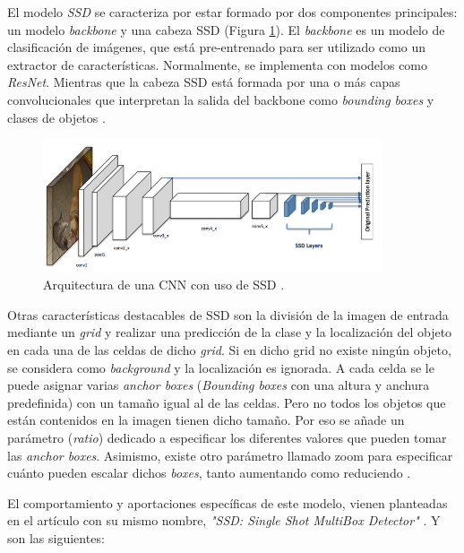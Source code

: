El modelo \textit{SSD} se caracteriza por estar formado por dos componentes principales: un modelo \textit{backbone} y una cabeza SSD (Figura \ref{fig:ssd}). El \textit{backbone} es un modelo de clasificación de imágenes, que está pre-entrenado para ser utilizado como un extractor de características. Normalmente, se implementa con modelos como \textit{ResNet}. Mientras que la cabeza SSD está formada por una o más capas convolucionales que interpretan la salida del backbone como \textit{bounding boxes} y clases de objetos \cite{ssdwork}. 

\begin{figure}[htp]
	\centering
	\includegraphics[width=10cm]{imagenes/cnnssd.png}
	\caption[Arquitectura de una CNN con uso de SSD.]{Arquitectura de una CNN con uso de SSD \cite{ssdwork}.}
	\label{fig:ssd}
\end{figure}

Otras características destacables de SSD son la división de la imagen de entrada mediante un \textit{grid} y realizar una predicción de la clase y la localización del objeto en cada una de las celdas de dicho \textit{grid}. Si en dicho grid no existe ningún objeto, se considera como \textit{background} y la localización es ignorada. A cada celda se le puede asignar varias \textit{anchor boxes} (\textit{Bounding boxes} con una altura y anchura predefinida) con un tamaño igual al de las celdas. Pero no todos los objetos que están contenidos en la imagen tienen dicho tamaño. Por eso se añade un parámetro (\textit{ratio}) dedicado a especificar los diferentes valores que pueden tomar las \textit{anchor boxes}. Asimismo, existe otro parámetro llamado zoom para especificar cuánto pueden escalar dichos \textit{boxes}, tanto aumentando como reduciendo \cite{ssdwork}.

El comportamiento y aportaciones específicas de este modelo, vienen planteadas en el artículo con su mismo nombre, \textit{"SSD: Single Shot MultiBox Detector"} \cite{ssd}. Y son las siguientes:

